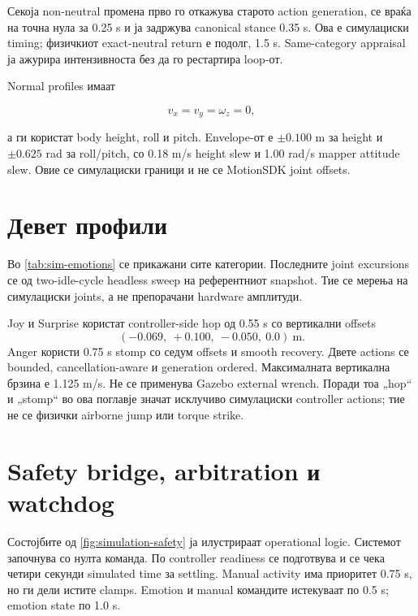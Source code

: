 Секоја non-neutral промена прво го откажува старото action generation, се
враќа на точна нула за 0.25 s и ја задржува canonical stance 0.35 s. Ова е
симулациски timing; физичкиот exact-neutral return е подолг, 1.5 s. Same-category
appraisal ја ажурира интензивноста без да го рестартира loop-от.

Normal profiles имаат

\begin{equation}
  v_x=v_y=\omega_z=0,
  \label{eq:centered}
\end{equation}

а ги користат body height, roll и pitch. Envelope-от е $\pm0.100$ m за height
и $\pm0.625$ rad за roll/pitch, со 0.18 m/s height slew и 1.00 rad/s mapper
attitude slew. Овие се симулациски граници и не се MotionSDK joint offsets.

\section{Девет профили}

Во \cref{tab:sim-emotions} се прикажани сите категории. Последните joint
excursions се од two-idle-cycle headless sweep на референтниот snapshot. Тие се
мерења на симулациски joints, а не препорачани hardware амплитуди.



Joy и Surprise користат controller-side hop од 0.55 s со вертикални offsets
\begin{equation*}
(-0.069,\ +0.100,\ -0.050,\ 0.0)\ \mathrm{m}.
\end{equation*}
Anger користи 0.75 s stomp со седум offsets и
smooth recovery. Двете actions се bounded, cancellation-aware и generation
ordered. Максималната вертикална брзина е 1.125 m/s. Не се применува Gazebo
external wrench. Поради тоа „hop“ и „stomp“ во ова поглавје значат исклучиво
симулациски controller actions; тие не се физички airborne jump или torque
strike.

\section{Safety bridge, arbitration и watchdog}

Состојбите од \cref{fig:simulation-safety} ја илустрираат operational logic.
Системот започнува со нулта команда. По controller readiness се подготвува
 и се чека четири секунди simulated time за settling. Manual
activity има приоритет 0.75 s, но ги дели истите clamps. Emotion и manual
командите истекуваат по 0.5 s; emotion state по 1.0 s.

